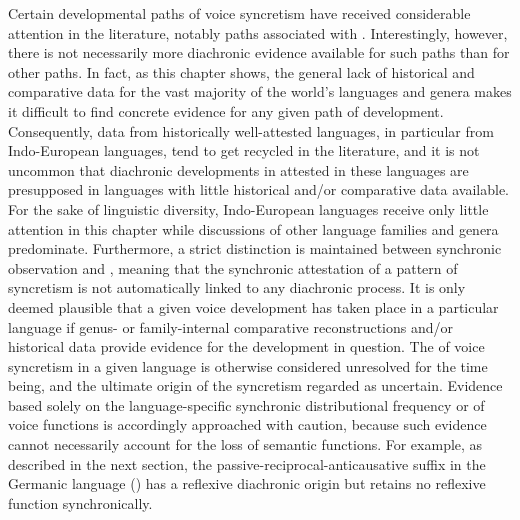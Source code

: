 Certain developmental paths of voice syncretism have received considerable attention in the literature, notably paths associated with . Interestingly, however, there is not necessarily more diachronic evidence available for such paths than for other paths. In fact, as this chapter shows, the general lack of historical and comparative data for the vast majority of the world’s languages and genera makes it difficult to find concrete evidence for any given path of development. Consequently, data from historically well-attested languages, in particular from Indo-European languages, tend to get recycled in the literature, and it is not uncommon that diachronic developments in attested in these languages are presupposed in languages with little historical and/or comparative data available. For the sake of linguistic diversity, Indo-European languages receive only little attention in this chapter while discussions of other language families and genera predominate. Furthermore, a strict distinction is maintained between synchronic observation and , meaning that the synchronic attestation of a pattern of syncretism is not automatically linked to any diachronic process. It is only deemed plausible that a given voice development has taken place in a particular language if genus- or family-internal comparative reconstructions and/or historical data provide evidence for the development in question. The  of voice syncretism in a given language is otherwise considered unresolved for the time being, and the ultimate origin of the syncretism regarded as uncertain. Evidence based solely on the language-specific synchronic distributional frequency or  of voice functions is accordingly approached with caution, because such evidence cannot necessarily account for the loss of semantic functions. For example, as described in the next section, the passive-reciprocal-anticausative suffix  in the Germanic language  () has a reflexive diachronic origin but retains no reflexive function synchronically. 

